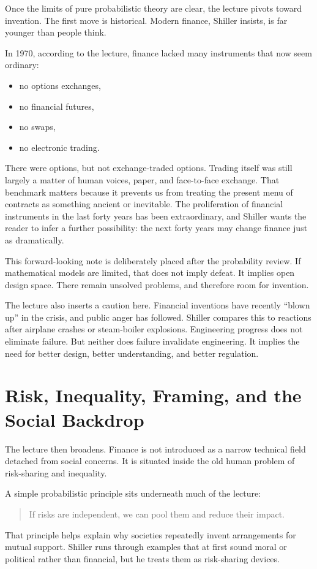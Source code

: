 Once the limits of pure probabilistic theory are clear, the lecture pivots toward invention. The first move is historical. Modern finance, Shiller insists, is far younger than people think.

In 1970, according to the lecture, finance lacked many instruments that now seem ordinary:
\begin{itemize}
\item no options exchanges,
\item no financial futures,
\item no swaps,
\item no electronic trading.
\end{itemize}

There were options, but not exchange-traded options. Trading itself was still largely a matter of human voices, paper, and face-to-face exchange. That benchmark matters because it prevents us from treating the present menu of contracts as something ancient or inevitable. The proliferation of financial instruments in the last forty years has been extraordinary, and Shiller wants the reader to infer a further possibility: the next forty years may change finance just as dramatically.

This forward-looking note is deliberately placed after the probability review. If mathematical models are limited, that does not imply defeat. It implies open design space. There remain unsolved problems, and therefore room for invention.

The lecture also inserts a caution here. Financial inventions have recently ``blown up'' in the crisis, and public anger has followed. Shiller compares this to reactions after airplane crashes or steam-boiler explosions. Engineering progress does not eliminate failure. But neither does failure invalidate engineering. It implies the need for better design, better understanding, and better regulation.

\section{Risk, Inequality, Framing, and the Social Backdrop}

The lecture then broadens. Finance is not introduced as a narrow technical field detached from social concerns. It is situated inside the old human problem of risk-sharing and inequality.

A simple probabilistic principle sits underneath much of the lecture:
\begin{quote}
If risks are independent, we can pool them and reduce their impact.
\end{quote}
That principle helps explain why societies repeatedly invent arrangements for mutual support. Shiller runs through examples that at first sound moral or political rather than financial, but he treats them as risk-sharing devices.

